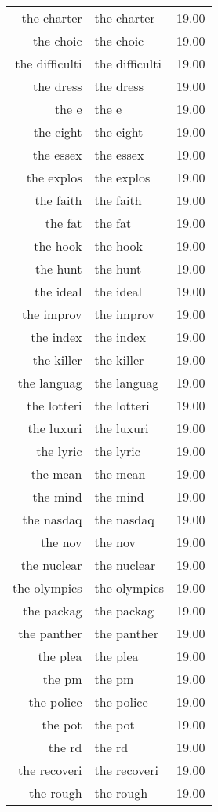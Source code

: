 \begin{table}[ht]
\begin{tabular}{rlr}
  the charter & the charter & 19.00 \\ 
  the choic & the choic & 19.00 \\ 
  the difficulti & the difficulti & 19.00 \\ 
  the dress & the dress & 19.00 \\ 
  the e & the e & 19.00 \\ 
  the eight & the eight & 19.00 \\ 
  the essex & the essex & 19.00 \\ 
  the explos & the explos & 19.00 \\ 
  the faith & the faith & 19.00 \\ 
  the fat & the fat & 19.00 \\ 
  the hook & the hook & 19.00 \\ 
  the hunt & the hunt & 19.00 \\ 
  the ideal & the ideal & 19.00 \\ 
  the improv & the improv & 19.00 \\ 
  the index & the index & 19.00 \\ 
  the killer & the killer & 19.00 \\ 
  the languag & the languag & 19.00 \\ 
  the lotteri & the lotteri & 19.00 \\ 
  the luxuri & the luxuri & 19.00 \\ 
  the lyric & the lyric & 19.00 \\ 
  the mean & the mean & 19.00 \\ 
  the mind & the mind & 19.00 \\ 
  the nasdaq & the nasdaq & 19.00 \\ 
  the nov & the nov & 19.00 \\ 
  the nuclear & the nuclear & 19.00 \\ 
  the olympics & the olympics & 19.00 \\ 
  the packag & the packag & 19.00 \\ 
  the panther & the panther & 19.00 \\ 
  the plea & the plea & 19.00 \\ 
  the pm & the pm & 19.00 \\ 
  the police & the police & 19.00 \\ 
  the pot & the pot & 19.00 \\ 
  the rd & the rd & 19.00 \\ 
  the recoveri & the recoveri & 19.00 \\ 
  the rough & the rough & 19.00 \\ 

\end{tabular}
\end{table}
